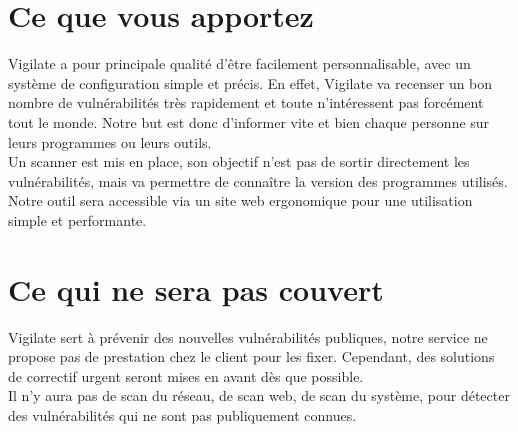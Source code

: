 \section{Ce que vous apportez}
\thispagestyle{plain}

Vigilate a pour principale qualité d’être facilement personnalisable, avec un système de configuration simple et précis. En effet, Vigilate va recenser un bon nombre de vulnérabilités très rapidement et toute n’intéressent pas forcément tout le monde. Notre but est donc d’informer vite et bien chaque personne sur leurs programmes ou leurs outils.\\
Un scanner est mis en place, son objectif n'est pas de sortir directement les vulnérabilités, mais va permettre de connaître la version des programmes utilisés.\\
Notre outil sera accessible via un site web ergonomique pour une utilisation simple et performante.\\

\section{Ce qui ne sera pas couvert}
\thispagestyle{plain}
Vigilate sert à prévenir des nouvelles vulnérabilités publiques, notre service ne propose pas de prestation chez le client pour les fixer. Cependant, des solutions de correctif urgent seront mises en avant dès que possible.\\
Il n’y aura pas de scan du réseau, de scan web, de scan du système, pour détecter des vulnérabilités qui ne sont pas publiquement connues.\\
